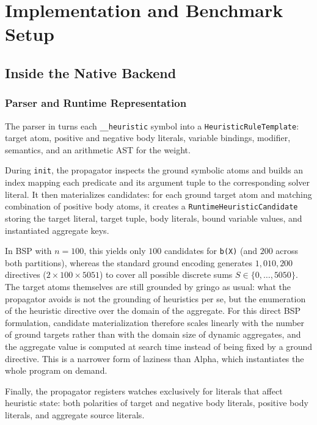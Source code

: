 \chapter{Implementation and Benchmark Setup}
\label{sec:implementation}

\section{Inside the Native Backend}
\label{sec:native-impl}

\subsection{Parser and Runtime Representation}
\label{sec:runtime}

The parser in  turns each \texttt{\_\_heuristic} symbol into a \texttt{HeuristicRuleTemplate}: target atom, positive and negative body literals, variable bindings, modifier, semantics, and an arithmetic AST for the weight.

During \texttt{init}, the propagator inspects the ground symbolic atoms and builds an index mapping each predicate and its argument tuple to the corresponding solver literal. It then materializes candidates: for each ground target atom and matching combination of positive body atoms, it creates a \texttt{RuntimeHeuristicCandidate} storing the target literal, target tuple, body literals, bound variable values, and instantiated aggregate keys.

In BSP with $n = 100$, this yields only $100$ candidates for \texttt{b(X)} (and $200$ across both partitions), whereas the standard ground encoding generates $1{,}010{,}200$ directives ($2 \times 100 \times 5051$) to cover all possible discrete sums $S \in \{0, \ldots, 5050\}$. The target atoms themselves are still grounded by gringo as usual: what the propagator avoids is not the grounding of heuristics per se, but the enumeration of the heuristic directive over the domain of the aggregate. For this direct BSP formulation, candidate materialization therefore scales linearly with the number of ground targets rather than with the domain size of dynamic aggregates, and the aggregate value is computed at search time instead of being fixed by a ground directive. This is a narrower form of laziness than Alpha, which instantiates the whole program on demand.

Finally, the propagator registers watches exclusively for literals that affect heuristic state: both polarities of target and negative body literals, positive body literals, and aggregate source literals.

